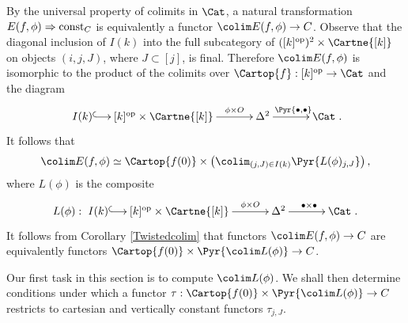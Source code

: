 \documentclass[a4paper]{article}
\numberwithin{equation}{section}
\begin{document}
By the universal property of colimits in $\Cat$, a natural transformation $ E(f,\phi) \Rightarrow {\rm const}_C$ is equivalently a functor $\colim E(f,\phi) \to C$. Observe that the diagonal inclusion of $I(k)$ into the full subcategory of $([k]^{\rm op})^2\times \Cartne{[k]}$ on objects $(i,j,J)$, where $ J \subset [j]$, is final. Therefore $\colim E(f,\phi)$ is isomorphic to the product of the colimits over $\Cartop{f}: [k]^{\rm op} \to \Cat$ and the diagram
 \begin{equation*}
  \xymatrixcolsep{1.1pc}\xymatrix{I(k) \ar@{^{(}->}[r] & [k]^{\rm op} \times \Cartne {[k]} \ar[rr]^-{\phi\times O} & &  \Delta^2 \ar[rr]^{\Pyr {\bullet,\bullet}} & & \Cat}.
 \end{equation*}
 It follows that 
 \begin{equation*}
 \colim E(f,\phi) \simeq \Cartop{f(0)} \times \left( \colim_{(j,J)\in I(k)} \Pyr{L(\phi)_{j,J}} \right),
 \end{equation*}
  where $L(\phi)$ is the composite
\begin{equation}
 \label{Mdiag}
 L(\phi):\xymatrixcolsep{1.1pc}\xymatrix{I(k) \ar@{^{(}->}[r] & [k]^{\rm op} \times \Cartne {[k]} \ar[rr]^-{\phi\times O} & &  \Delta^2 \ar[rr]^{\bullet \times \bullet} & & \Cat}.
\end{equation}
It follows from Corollary \ref{Twistedcolim} that functors $\colim E(f,\phi) \to C$ are equivalently functors $\Cartop{f(0)} \times \Pyr{\colim L(\phi)} \to C$. 

Our first task in this section is to compute $\colim L(\phi)$. We shall then determine conditions under which a functor $\tau: \Cartop{f(0)} \times \Pyr{\colim L(\phi)} \to C$ restricts to cartesian and vertically constant functors $\tau_{j,J}$.
\end{document}
